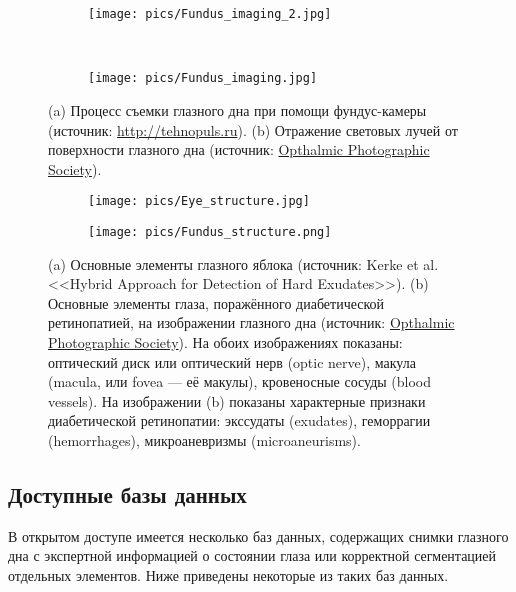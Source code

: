 \documentclass[12pt,fleqn]{article}
\begin{document}
\begin{figure}
	\centering
	\begin{subfigure}[b]{.47\textwidth}
		\texttt{[image: pics/Fundus\_imaging\_2.jpg]}
		\caption{}
	\end{subfigure}
	~
	\begin{subfigure}[b]{.4\textwidth}
		\texttt{[image: pics/Fundus\_imaging.jpg]}
		\caption{}
	\end{subfigure}
	\caption{(a) Процесс съемки глазного дна при помощи фундус-камеры (источник: \url{http://tehnopuls.ru}). (b) Отражение световых лучей от поверхности глазного дна (источник: \href{http://www.opsweb.org}{Opthalmic Photographic Society}).}
	\label{fig:fundus_imaging}
\end{figure}

\begin{figure}
	\centering
	\begin{subfigure}[b]{.8\textwidth}
		\texttt{[image: pics/Eye\_structure.jpg]}
		\caption{}
		\label{fig:normal_eye}
	\end{subfigure}
	\hfill
	\begin{subfigure}[b]{.6\textwidth}
		\texttt{[image: pics/Fundus\_structure.png]}
		\caption{}
		\label{fig:diabetic_eye}
	\end{subfigure}
	\caption{(a) Основные элементы глазного яблока (источник: Kerke et al. <<Hybrid Approach for Detection of Hard Exudates>>). (b) Основные элементы глаза, поражённого диабетической ретинопатией, на изображении глазного дна (источник: \href{http://www.opsweb.org}{Opthalmic Photographic Society}). На обоих изображениях показаны: оптический диск или оптический нерв (optic nerve), макула (macula, или fovea --- её макулы), кровеносные сосуды (blood vessels). На изображении (b) показаны характерные признаки диабетической ретинопатии: экссудаты (exudates), геморрагии (hemorrhages), микроаневризмы (microaneurisms).}
	\label{fig:eye_structure}
\end{figure}

\subsection{Доступные базы данных}

В открытом доступе имеется несколько баз данных, содержащих снимки глазного дна с экспертной информацией о состоянии глаза или корректной сегментацией отдельных элементов. Ниже приведены некоторые из таких баз данных.
\end{document}
